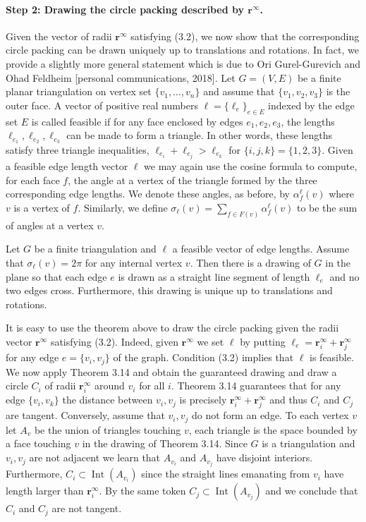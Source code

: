 \paragraph{Step 2: Drawing the circle packing described by $\mathbf r^\infty$.}
Given the vector of radii $\mathbf r^\infty$ satisfying (3.2), we now show that the corresponding circle packing can be drawn uniquely up to translations and rotations. In fact, we provide a slightly more general statement which is due to Ori Gurel-Gurevich and Ohad Feldheim [personal communications, 2018].
Let $G=(V,E)$ be a finite planar triangulation on vertex set $\{v_1,\ldots,v_n\}$ and assume that $\{v_1,v_2,v_3\}$ is the outer face. A vector of positive real numbers $\boldsymbol\ell=\{\ell_e\}_{e\in E}$ indexed by the edge set $E$ is called feasible if for any face enclosed by edges $e_1,e_2,e_3$, the lengths $\ell_{e_1},\ell_{e_2},\ell_{e_3}$ can be made to form a triangle. In other words, these lengths satisfy three triangle inequalities,
$\ell_{e_i}+\ell_{e_j}>\ell_{e_k}$ for $\{i,j,k\}=\{1,2,3\}$.
Given a feasible edge length vector $\boldsymbol\ell$ we may again use the cosine formula to compute, for each face $f$, the angle at a vertex of the triangle formed by the three corresponding edge lengths. We denote these angles, as before, by $\alpha_f^{\boldsymbol\ell}(v)$ where $v$ is a vertex of $f$. Similarly, we define $\sigma_{\boldsymbol\ell}(v)=\sum_{f\in F(v)}\alpha_f^{\boldsymbol\ell}(v)$ to be the sum of angles at a vertex $v$.
\begin{theorem}[3.14]
Let $G$ be a finite triangulation and $\boldsymbol\ell$ a feasible vector of edge lengths. Assume that $\sigma_{\boldsymbol\ell}(v)=2\pi$ for any internal vertex $v$. Then there is a drawing of $G$ in the plane so that each edge $e$ is drawn as a straight line segment of length $\ell_e$ and no two edges cross. Furthermore, this drawing is unique up to translations and rotations.
\end{theorem}
It is easy to use the theorem above to draw the circle packing given the radii vector $\mathbf r^\infty$ satisfying (3.2). Indeed, given $\mathbf r^\infty$ we set $\boldsymbol\ell$ by putting $\ell_e=\mathbf r_i^\infty+\mathbf r_j^\infty$ for any edge $e=\{v_i,v_j\}$ of the graph. Condition (3.2) implies that $\boldsymbol\ell$ is feasible. We now apply Theorem 3.14 and obtain the guaranteed drawing and draw a circle $C_i$ of radii $\mathbf r_i^\infty$ around $v_i$ for all $i$.
Theorem 3.14 guarantees that for any edge $\{v_i,v_k\}$ the distance between $v_i,v_j$ is precisely $\mathbf r_i^\infty+\mathbf r_j^\infty$ and thus $C_i$ and $C_j$ are tangent. Conversely, assume that $v_i,v_j$ do not form an edge. To each vertex $v$ let $A_v$ be the union of triangles touching $v$, each triangle is the space bounded by a face touching $v$ in the drawing of Theorem 3.14. Since $G$ is a triangulation and $v_i,v_j$ are not adjacent we learn that $A_{v_i}$ and $A_{v_j}$ have disjoint interiors. Furthermore, $C_i\subset\operatorname{Int}(A_{v_i})$ since the straight lines emanating from $v_i$ have length larger than $\mathbf r_i^\infty$. By the same token $C_j\subset\operatorname{Int}(A_{v_j})$ and we conclude that $C_i$ and $C_j$ are not tangent.
